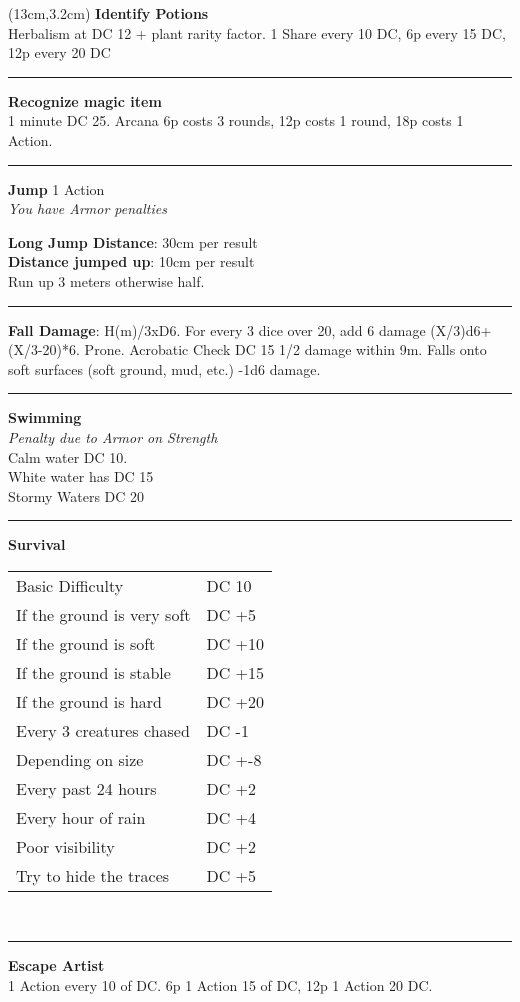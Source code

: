 \documentclass[a4paper,12 pt,openany]{book}
\newcommand{\linex}{\rule{\textwidth}{0.4pt}}
\begin{document}
\begin{textblock*}{7cm}(13cm,3.2cm) %
\textbf{Identify Potions}\\
Herbalism at DC 12 + plant rarity factor. 1 Share every 10 DC, 6p every 15 DC, 12p every 20 DC

\linex

\textbf{Recognize magic item}\\
1 minute DC 25. Arcana 6p costs 3 rounds, 12p costs 1 round, 18p costs 1 Action.

\linex

\textbf{Jump} 1 Action\\
\textit{You have Armor penalties}

\textbf{Long Jump Distance}: 30cm per result\\

\textbf{Distance jumped up}: 10cm per result\\

Run up 3 meters otherwise half.

\linex

\textbf{Fall Damage}: H(m)/3xD6. For every 3 dice over 20, add 6 damage (X/3)d6+(X/3-20)*6. Prone. Acrobatic Check DC 15 1/2 damage within 9m. Falls onto soft surfaces (soft ground, mud, etc.) -1d6 damage.

\linex

\textbf{Swimming}\\
\textit{Penalty due to Armor on Strength}\\
Calm water DC 10.\\
White water has DC 15\\
Stormy Waters DC 20

\linex

\textbf{Survival}
\begin{tabular}{ll}
Basic Difficulty & DC 10\\
If the ground is very soft& DC +5\\
If the ground is soft& DC +10\\
If the ground is stable& DC +15\\
If the ground is hard& DC +20\\
Every 3 creatures chased& DC -1\\
Depending on size & DC +-8\\
Every past 24 hours&DC +2\\
Every hour of rain&DC +4\\
Poor visibility&DC +2\\
Try to hide the traces&DC +5\\
\end{tabular}\\

\linex

\textbf{Escape Artist}\\
1 Action every 10 of DC. 6p 1 Action 15 of DC, 12p 1 Action 20 DC.

\end{textblock*}
\end{document}
